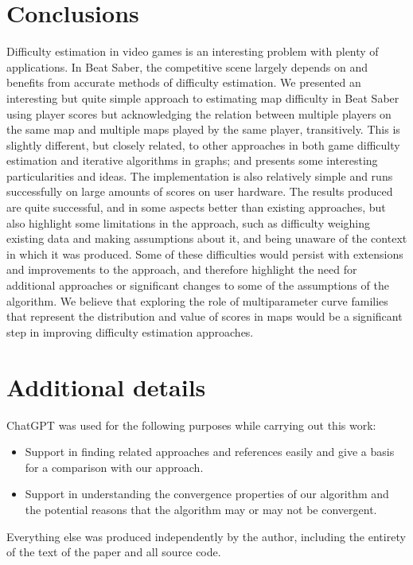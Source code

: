 \documentclass[12pt,a4paper]{article}
\begin{document}
\section{Conclusions}
\label{conclusions}

Difficulty estimation in video games is an interesting problem with plenty of applications. In Beat Saber, the competitive scene largely depends on and benefits from accurate methods of difficulty estimation. We presented an interesting but quite simple approach to estimating map difficulty in Beat Saber using player scores but acknowledging the relation between multiple players on the same map and multiple maps played by the same player, transitively. This is slightly different, but closely related, to other approaches in both game difficulty estimation and iterative algorithms in graphs; and presents some interesting particularities and ideas. The implementation is also relatively simple and runs successfully on large amounts of scores on user hardware. The results produced are quite successful, and in some aspects better than existing approaches, but also highlight some limitations in the approach, such as difficulty weighing existing data and making assumptions about it, and being unaware of the context in which it was produced. Some of these difficulties would persist with extensions and improvements to the approach, and therefore highlight the need for additional approaches or significant changes to some of the assumptions of the algorithm. We believe that exploring the role of multiparameter curve families that represent the distribution and value of scores in maps would be a significant step in improving difficulty estimation approaches.

\section{Additional details}

ChatGPT was used for the following purposes while carrying out this work:

\begin{itemize}

\item Support in finding related approaches and references easily and give a basis for a comparison with our approach.
\item Support in understanding the convergence properties of our algorithm and the potential reasons that the algorithm may or may not be convergent.

\end{itemize}

Everything else was produced independently by the author, including the entirety of the text of the paper and all source code.



\end{document}
